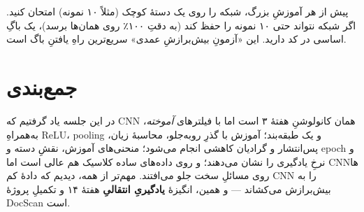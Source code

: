 \documentclass[12pt,a4paper]{article}
\begin{document}
\begin{hoshdar}
پیش از هر آموزشِ بزرگ، شبکه را روی یک دستهٔ کوچک (مثلاً ۱۰ نمونه) امتحان کنید. اگر شبکه نتواند حتی ۱۰ نمونه را حفظ کند (به دقتِ ۱۰۰٪ روی همان‌ها برسد)، یک باگِ اساسی در کد دارید. این «آزمونِ بیش‌برازشِ عمدی» سریع‌ترین راهِ یافتنِ باگ است.
\end{hoshdar}

\section{جمع‌بندی}

در این جلسه یاد گرفتیم که CNN همان کانولوشنِ هفتهٔ ۳ است اما با فیلترهای \emph{آموخته}، به‌همراهِ ReLU، pooling و یک طبقه‌بند؛ آموزش با گذرِ رو‌به‌جلو، محاسبهٔ زیان، پس‌انتشار و گرادیان کاهشی انجام می‌شود؛ منحنی‌های آموزش، نقشِ دسته و epoch و نرخِ یادگیری را نشان می‌دهند؛ و روی داده‌های ساده کلاسیک هم عالی است اما CNNها روی مسائلِ سخت جلو می‌افتند. مهم‌تر از همه، دیدیم که دادهٔ کم CNN را به بیش‌برازش می‌کشاند — و همین، انگیزهٔ \textbf{یادگیریِ انتقالیِ} هفتهٔ ۱۴ و تکمیلِ پروژهٔ DocScan است.
\end{document}
